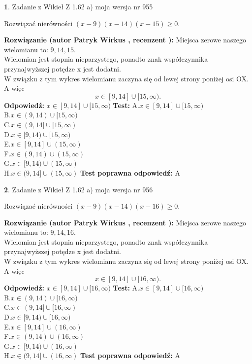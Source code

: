 \documentclass[12pt, a4paper]{article}
\theoremstyle{definition} %
\newtheorem{zad}{}
\newcommand{\zadStart}[1]{\begin{zad}#1\newline}
\newcommand{\zadStop}{\end{zad}}
\newcommand{\rozwStart}[2]{\noindent \textbf{Rozwiązanie (autor #1 , recenzent #2): }\newline}
\newcommand{\rozwStop}{\newline}
\newcommand{\odpStart}{\noindent \textbf{Odpowiedź:}\newline}
\newcommand{\odpStop}{\newline}
\newcommand{\testStart}{\noindent \textbf{Test:}\newline}
\newcommand{\testStop}{\newline}
\newcommand{\kluczStart}{\noindent \textbf{Test poprawna odpowiedź:}\newline}
\newcommand{\kluczStop}{\newline}
\begin{document}
\zadStart{Zadanie z Wikieł Z 1.62 a) moja wersja nr 955}

Rozwiązać nierówności $(x-9)(x-14)(x-15)\ge0$.
\zadStop
\rozwStart{Patryk Wirkus}{}
Miejsca zerowe naszego wielomianu to: $9, 14, 15$.\\
Wielomian jest stopnia nieparzystego, ponadto znak współczynnika przy\linebreak najwyższej potędze x jest dodatni.\\ W związku z tym wykres wielomianu zaczyna się od lewej strony poniżej osi OX. A więc $$x \in [9,14] \cup [15,\infty).$$
\rozwStop
\odpStart
$x \in [9,14] \cup [15,\infty)$
\odpStop
\testStart
A.$x \in [9,14] \cup [15,\infty)$\\
B.$x \in (9,14) \cup [15,\infty)$\\
C.$x \in (9,14] \cup [15,\infty)$\\
D.$x \in [9,14) \cup [15,\infty)$\\
E.$x \in [9,14] \cup (15,\infty)$\\
F.$x \in (9,14) \cup (15,\infty)$\\
G.$x \in [9,14) \cup (15,\infty)$\\
H.$x \in (9,14] \cup (15,\infty)$
\testStop
\kluczStart
A
\kluczStop



\zadStart{Zadanie z Wikieł Z 1.62 a) moja wersja nr 956}

Rozwiązać nierówności $(x-9)(x-14)(x-16)\ge0$.
\zadStop
\rozwStart{Patryk Wirkus}{}
Miejsca zerowe naszego wielomianu to: $9, 14, 16$.\\
Wielomian jest stopnia nieparzystego, ponadto znak współczynnika przy\linebreak najwyższej potędze x jest dodatni.\\ W związku z tym wykres wielomianu zaczyna się od lewej strony poniżej osi OX. A więc $$x \in [9,14] \cup [16,\infty).$$
\rozwStop
\odpStart
$x \in [9,14] \cup [16,\infty)$
\odpStop
\testStart
A.$x \in [9,14] \cup [16,\infty)$\\
B.$x \in (9,14) \cup [16,\infty)$\\
C.$x \in (9,14] \cup [16,\infty)$\\
D.$x \in [9,14) \cup [16,\infty)$\\
E.$x \in [9,14] \cup (16,\infty)$\\
F.$x \in (9,14) \cup (16,\infty)$\\
G.$x \in [9,14) \cup (16,\infty)$\\
H.$x \in (9,14] \cup (16,\infty)$
\testStop
\kluczStart
A
\kluczStop
\end{document}
